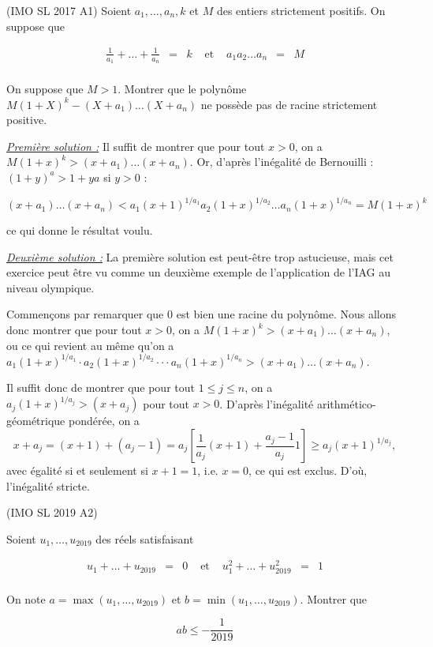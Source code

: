 \begin{exo}
(IMO SL 2017 A1)
Soient $a_1, \ldots, a_n, k$ et $M$ des entiers strictement positifs. On suppose que

\[\begin{array}{lllllll}
\frac1{a_1}+ \ldots + \frac1{a_n} &=& k &\text{ et }& a_1 a_2 \ldots a_n &=& M\\
\end{array}\]

On suppose que $M>1$. Montrer que le polynôme $M(1+X)^k-(X+a_1) \ldots (X+a_n)$ ne possède pas de racine strictement positive.
\end{exo}

\begin{sol}

\underline{\textit{Première solution :}}
Il suffit de montrer que pour tout $x>0$, on a $M(1+x)^k > (x+a_1) \ldots (x+a_n)$. Or, d'après l'inégalité de Bernouilli : $(1+y)^a > 1+ya$ si $y>0$ :

\[ (x+a_1) \ldots (x+a_n) < a_1(x+1)^{1/a_1} a_2 (1+x)^{1/a_2} \ldots a_n (1+x)^{1/a_n} = M(1+x)^k\]

ce qui donne le résultat voulu.

\underline{\textit{Deuxième solution :}}
La première solution est peut-être trop astucieuse, mais cet exercice peut être vu comme un deuxième exemple de l'application de l'IAG au niveau olympique.

Commençons par remarquer que $0$ est bien une racine du polynôme. Nous allons donc montrer que pour tout $x>0$, on a $M(1+x)^k > (x+a_1) \ldots (x+a_n)$, ou ce qui revient au même qu'on a $a_1(1+x)^{1/a_1} \cdot a_2(1+x)^{1/a_2} \cdot \cdot \cdot a_n(1+x)^{1/a_n} >(x+a_1) \ldots (x+a_n)$.

Il suffit donc de montrer que pour tout $1 \leq j \leq n$, on a $a_j(1+x)^{1/a_j} > (x+a_j)$ pour tout $x>0$. D'après l'inégalité arithmético-géométrique pondérée, on a
\[
x+a_j=(x+1)+(a_j-1)=a_j\left[\frac1{a_j}(x+1)+\frac{a_j-1}{a_j}1\right] \geq a_j(x+1)^{1/a_j},
\]
avec égalité si et seulement si $x+1=1$, i.e. $x=0$, ce qui est exclus. D'où, l'inégalité stricte.
\end{sol}


\begin{exo}
(IMO SL 2019 A2)

Soient $u_1, \ldots , u_{2019}$ des réels satisfaisant

\[\begin{array}{lllllll}
u_1 + \ldots + u_{2019} &=& 0 & \text{ et } & u_1^2+ \ldots + u_{2019}^2 &=& 1 \\
\end{array}\]

On note $a= \max (u_1, \ldots , u_{2019})$ et $b= \min (u_1, \ldots , u_{2019})$. Montrer que

\[ab \leqslant - \frac1{2019}\]
\end{exo}

